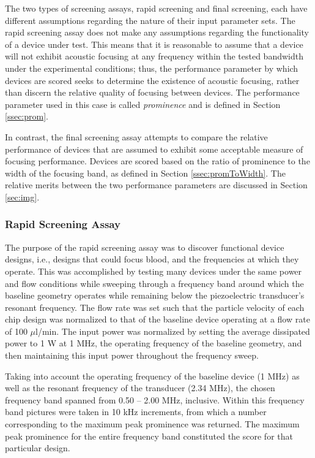 The two types of screening assays, rapid screening and final screening, each have different assumptions regarding the nature of their input parameter sets. The rapid screening assay does not make any assumptions regarding the functionality of a device under test. This means that it is reasonable to assume that a device will not exhibit acoustic focusing at any frequency within the tested bandwidth under the experimental conditions; thus, the performance parameter by which devices are scored seeks to determine the existence of acoustic focusing, rather than discern the relative quality of focusing between devices. The performance parameter used in this case is called \emph{prominence} and is defined in Section \ref{ssec:prom}. 

In contrast, the final screening assay attempts to compare the relative performance of devices that are assumed to exhibit some acceptable measure of focusing performance. Devices are scored based on the ratio of prominence to the width of the focusing band, as defined in Section \ref{ssec:promToWidth}. The relative merits between the two performance parameters are discussed in Section \ref{sec:img}. 

\subsubsection{Rapid Screening Assay}
\label{sssec:rapidScreen}

The purpose of the rapid screening assay was to discover functional device designs, i.e., designs that could focus blood, and the frequencies at which they operate. This was accomplished by testing many devices under the same power and flow conditions while sweeping through a frequency band around which the baseline geometry operates while remaining below the piezoelectric transducer's resonant frequency. The flow rate was set such that the particle velocity of each chip design was normalized to that of the baseline device operating at a flow rate of 100 $\mu$l/min. The input power was normalized by setting the average dissipated power to 1 W at 1 MHz, the operating frequency of the baseline geometry, and then maintaining this input power throughout the frequency sweep.

Taking into account the operating frequency of the baseline device (1 MHz) as well as the resonant frequency of the transducer (2.34 MHz), the chosen frequency band spanned from 0.50 -- 2.00 MHz, inclusive. Within this frequency band pictures were taken in 10 kHz increments, from which a number corresponding to the maximum peak prominence was returned. The maximum peak prominence for the entire frequency band constituted the score for that particular design.

